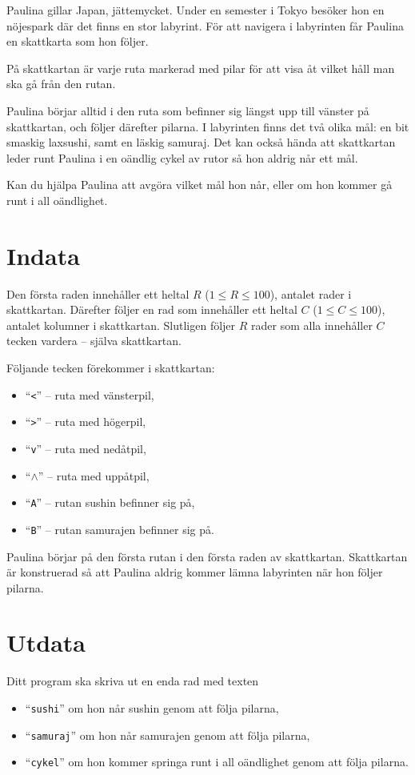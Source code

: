 Paulina gillar Japan, jättemycket.
Under en semester i Tokyo besöker hon en nöjespark där det finns en stor labyrint.
För att navigera i labyrinten får Paulina en skattkarta som hon följer.

På skattkartan är varje ruta markerad med pilar för att visa åt vilket håll man ska gå från den rutan.

Paulina börjar alltid i den ruta som befinner sig längst upp till vänster på skattkartan, och följer därefter pilarna.
I labyrinten finns det två olika mål: en bit smaskig laxsushi, samt en läskig samuraj.
Det kan också hända att skattkartan leder runt Paulina i en oändlig cykel av rutor så hon aldrig når ett mål.

Kan du hjälpa Paulina att avgöra vilket mål hon når, eller om hon kommer gå runt i all oändlighet.

\section*{Indata}
Den första raden innehåller ett heltal $R$ ($1 \leq R \leq 100$), antalet rader i skattkartan.
Därefter följer en rad som innehåller ett heltal $C$ ($1 \leq C \leq 100$), antalet kolumner i skattkartan.
Slutligen följer $R$ rader som alla innehåller $C$ tecken vardera -- själva skattkartan.

Följande tecken förekommer i skattkartan:
\begin{itemize}
\item ``\texttt{<}'' -- ruta med vänsterpil,
\item ``\texttt{>}'' -- ruta med högerpil,
\item ``\texttt{v}'' -- ruta med nedåtpil,
\item ``$\wedge$'' -- ruta med uppåtpil,
\item ``\texttt{A}'' -- rutan sushin befinner sig på,
\item ``\texttt{B}'' -- rutan samurajen befinner sig på.
\end{itemize}

Paulina börjar på den första rutan i den första raden av skattkartan.
Skattkartan är konstruerad så att Paulina aldrig kommer lämna labyrinten när hon följer pilarna.

\section*{Utdata}
Ditt program ska skriva ut en enda rad med texten 
\begin{itemize}
\item ``\texttt{sushi}'' om hon når sushin genom att följa pilarna,
\item ``\texttt{samuraj}'' om hon når samurajen genom att följa pilarna,
\item ``\texttt{cykel}'' om hon kommer springa runt i all oändlighet genom att följa pilarna.
\end{itemize}

